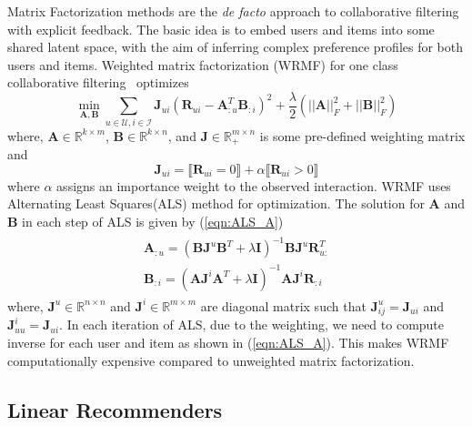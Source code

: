 \documentclass{article}
\newcommand{\indicator}[1]{\llbracket #1 \rrbracket}
\newcommand{\Real}{\mathbb{R}}
\newcommand{\R}{\mathbf{R}}
\newcommand{\A}{\mathbf{A}}
\newcommand{\B}{\mathbf{B}}
\newcommand{\I}{\mathbf{I}}
\newcommand{\J}{\mathbf{J}}
\newcommand{\numUsers}{m}
\newcommand{\numItems}{n}
\newcommand{\userSet}{\mathcal{U}}
\newcommand{\itemSet}{\mathcal{I}}
\renewcommand{\u}{u}
\renewcommand{\i}{i}
\newcommand{\ui}{\u\i}
\begin{document}
Matrix Factorization methods are the \emph{de facto} approach to collaborative filtering with explicit feedback. The basic idea is to embed users and items into some shared latent space, with the aim of inferring complex preference profiles for both users and items.
Weighted matrix factorization (WRMF) for one class collaborative filtering~\cite{Hu:2008, Pan:2009} optimizes
\begin{equation}
\label{eqn:wrmf}
\min_{ \A,\B  } \sum_{ u \in \userSet, i \in \itemSet } \J_{\ui} ( \R_{\ui} - \A_{:u}^T \B_{:i} )^2 + \frac{\lambda}{2}  ( ||\A||_F^2 + ||\B||_F^2 )
\end{equation}
where, $\A\in\Real^{k\times m}$, $\B\in\Real^{k\times n}$, and $\J \in \Real_+^{\numUsers \times \numItems}$ is some pre-defined weighting matrix  and
\begin{equation}
\label{eqn:wrmf-weight}
\J_{\ui} =  \indicator{ \R_{\ui} = 0 } + \alpha \indicator{ \R_{\ui} > 0 }
\end{equation}
where $\alpha$ assigns an importance weight to the observed interaction.
WRMF uses Alternating Least Squares(ALS) method for optimization. The solution for $\A$ and $\B$ in each step of ALS is given by (\ref{eqn:ALS_A})
\begin{align}
	\label{eqn:ALS_A}
	\begin{split}
	\A_{:u} = (\B \J^u \B^T + \lambda \I)^{-1} \B \J^u \R_{u:}^{T} \\
	\B_{:i} = (\A \J^i \A^T + \lambda \I)^{-1} \A \J^i \R_{:i}
	\end{split}
\end{align}
where, $\J^u \in \mathbb{R}^{n \times n}$ and $\J^i \in \mathbb{R}^{m \times m}$ are diagonal matrix such that $ \J^u_{ij} = \J_{ui}$ and  $\J^i_{uu} = \J_{ui}$. In each iteration of ALS, due to the weighting, we need to compute inverse for each user and item as shown in (\ref{eqn:ALS_A}). This makes WRMF computationally expensive compared to unweighted matrix factorization.

\subsection{Linear Recommenders}
\end{document}

